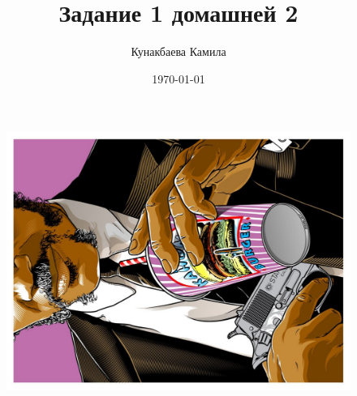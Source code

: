 \documentclass[12pt, a4paper]{article}
\author{Кунакбаева Камила}
\title{Задание 1 домашней 2}
\date{\today}
\begin{document}
 

\maketitle

\begin{figure}
\begin{minipage}[h!]{0.3\linewidth}
\includegraphics[height = 0.2\textheight,width=1.62\textwidth, angle=270]{pop1}
\end{minipage}
\hfil
\begin{minipage}[h!]{0.3\linewidth}

\end{minipage}
\end{figure}
\end{document}
